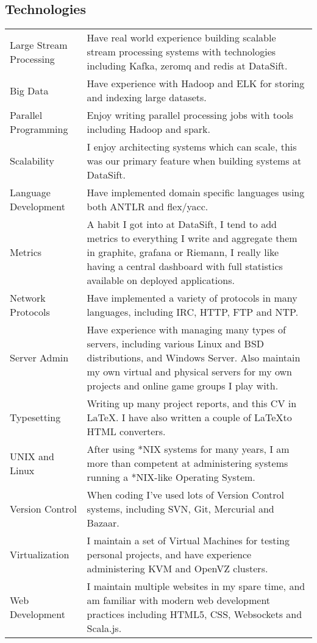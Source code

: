 \documentclass[a4paper]{article}
\begin{document}
\subsection*{Technologies}
\begin{tabular}{ l p{12.3cm} }
Large Stream Processing & Have real world experience building scalable stream processing systems with technologies including Kafka, zeromq and redis at DataSift.\\
Big Data & Have experience with Hadoop and ELK for storing and indexing large datasets.\\
Parallel Programming & Enjoy writing parallel processing jobs with tools including Hadoop and spark.\\
Scalability & I enjoy architecting systems which can scale, this was our primary feature when building systems at DataSift.\\
Language Development & Have implemented domain specific languages using both ANTLR and flex/yacc.\\
Metrics & A habit I got into at DataSift, I tend to add metrics to everything I write and aggregate them in graphite, grafana or Riemann, I really like having a central dashboard with full statistics available on deployed applications.\\
Network Protocols & Have implemented a variety of protocols in many languages, including IRC, HTTP, FTP and NTP.\\
Server Admin & Have experience with managing many types of servers, including various Linux and BSD distributions, and Windows Server. Also maintain my own virtual and physical servers for my own projects and online game groups I play with.\\
Typesetting & Writing up many project reports, and this CV in \LaTeX. I have also written a couple of \LaTeX to HTML converters.\\
UNIX and Linux & After using *NIX systems for many years, I am more than competent at administering systems running a *NIX-like Operating System.\\
Version Control & When coding I've used lots of Version Control systems, including SVN, Git, Mercurial and Bazaar.\\
Virtualization & I maintain a set of Virtual Machines for testing personal projects, and have experience administering KVM and OpenVZ clusters.\\
Web Development & I maintain multiple websites in my spare time, and am familiar with modern web development practices including HTML5, CSS, Websockets and Scala.js.\\
\end{tabular}
\end{document}
